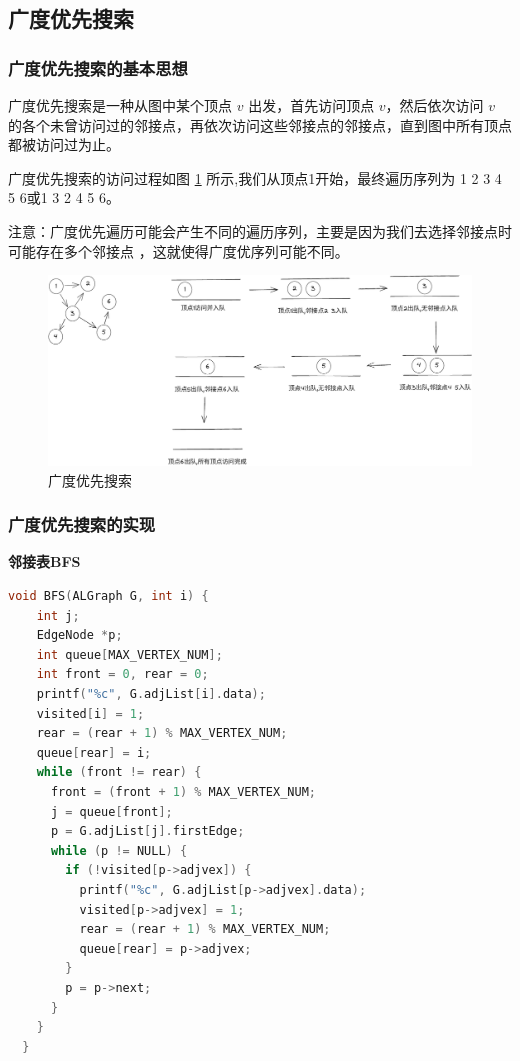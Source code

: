 \documentclass[lang=cn,newtx,10pt,scheme=chinese]{elegantbook}
\begin{document}
\subsection{广度优先搜索}

\subsubsection{广度优先搜索的基本思想}

广度优先搜索是一种从图中某个顶点 $v$ 出发，首先访问顶点 $v$，然后依次访问 $v$ 的各个未曾访问过的邻接点，再依次访问这些邻接点的邻接点，直到图中所有顶点都被访问过为止。

广度优先搜索的访问过程如图 \ref{fig:breadthFirst} 所示,我们从顶点1开始，最终遍历序列为 1 2 3 4 5 6或1 3 2 4 5 6。

注意：广度优先遍历可能会产生不同的遍历序列，主要是因为我们去选择邻接点时可能存在多个邻接点 ，这就使得广度优序列可能不同。

\begin{figure}[h!]
  \centering
  \includegraphics[width=1\textwidth]{./figure/pdf/cropped/breadthFirst.pdf}
  \caption{广度优先搜索}
  \label{fig:breadthFirst}
\end{figure}


\subsubsection{广度优先搜索的实现}

\textbf{邻接表BFS}

\begin{lstlisting}[language=C++, caption={邻接表BFS}]
  void BFS(ALGraph G, int i) {
    int j;
    EdgeNode *p;
    int queue[MAX_VERTEX_NUM];
    int front = 0, rear = 0;
    printf("%c", G.adjList[i].data);
    visited[i] = 1;
    rear = (rear + 1) % MAX_VERTEX_NUM;
    queue[rear] = i;
    while (front != rear) {
      front = (front + 1) % MAX_VERTEX_NUM;
      j = queue[front];
      p = G.adjList[j].firstEdge;
      while (p != NULL) {
        if (!visited[p->adjvex]) {
          printf("%c", G.adjList[p->adjvex].data);
          visited[p->adjvex] = 1;
          rear = (rear + 1) % MAX_VERTEX_NUM;
          queue[rear] = p->adjvex;
        }
        p = p->next;
      }
    }
  }

\end{lstlisting}
\end{document}
